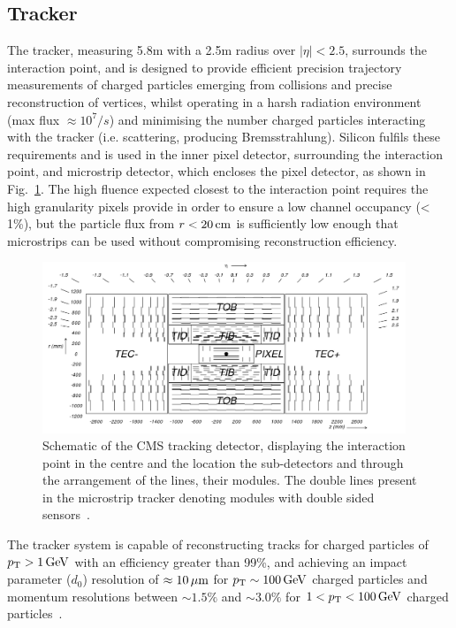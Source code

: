 \subsection{Tracker}\label{subsec:tracker}
The tracker, measuring 5.8m with a 2.5m radius over $|\eta| < 2.5$, surrounds the interaction point, and is designed to provide efficient precision trajectory measurements of charged particles emerging from collisions and precise reconstruction of vertices, whilst operating in a harsh radiation environment (max flux $\approx 10^{7}/s$) and minimising the number charged particles interacting with the tracker (i.e. scattering, producing Bremsstrahlung).
Silicon fulfils these requirements and is used in the inner pixel detector, surrounding the interaction point, and microstrip detector, which encloses the pixel detector, as shown in Fig.~\ref{fig:tracker}.
The high fluence expected closest to the interaction point requires the high granularity pixels provide in order to ensure a low channel occupancy (< 1\%), but the particle flux from $r < 20\,\text{cm}$ is sufficiently low enough that microstrips can be used without compromising reconstruction efficiency.

\begin{figure}[htbp]
\begin{center}
\includegraphics[width=0.97\textwidth]{figs/cms/fig_cmstracker.png}
\caption{Schematic of the CMS tracking detector, displaying the interaction point in the centre and the location the sub-detectors and through the arrangement of the lines, their modules. The double lines present in the microstrip tracker denoting modules with double sided sensors~\cite{Sprenger:2010ss}.}
\label{fig:tracker}
\end{center}
\end{figure}

The tracker system is capable of reconstructing tracks for charged particles of $p_{\mathrm{T}} > 1\,\text{Ge\hspace{-.08em}V}$ with an efficiency greater than 99\%, and achieving an impact parameter ($d_{0}$) resolution of $\approx 10\,\mu\text{m}$ for $p_{\mathrm{T}} \sim 100\,\text{Ge\hspace{-.08em}V}$ charged particles and momentum resolutions between $\sim 1.5\%$ and $\sim 3.0\%$ for $1 < p_{\mathrm{T}} < 100\,\text{Ge\hspace{-.08em}V}$ charged particles~\cite{Khachatryan:2010pw,Chatrchyan:2014fea}.

